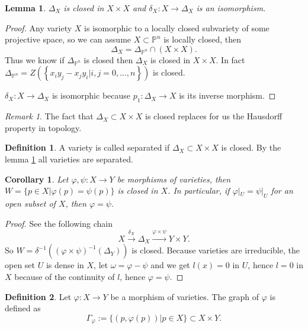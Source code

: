 \documentclass{amsart}
\theoremstyle{plain}
\newtheorem{corollary}{Corollary}
\newtheorem{lemma}{Lemma}
\theoremstyle{definition}
\newtheorem{definition}{Definition}
\theoremstyle{remark}
\newtheorem*{remark}{Remark}
\numberwithin{equation}{section}
\begin{document}
 \begin{lemma}\label{20}
 	$ \Delta_X $ is closed in $ X\times X $ and $ \delta_X:X\to \Delta_X $ is an isomorphism.
 \end{lemma}
 \begin{proof}
 	Any variety $ X $ is isomorphic to a locally closed subvariety of some projective space, so we can assume $ X\subset\mathbb{P}^n $ is locally closed, then
 	$$
 	\Delta_X=\Delta_{\mathbb{P}^n}\cap (X\times X).
 	$$
 	Thus we know if $ \Delta_{\mathbb{P}^n} $ is closed then $ \Delta_X $ is closed in $ X\times X $.
 	In fact $ \Delta_{\mathbb{P}^n}=Z\left( \left\lbrace x_iy_j-x_jy_i|i,j=0,\dots,n \right\rbrace \right) $ is closed.
 	
 	$ \delta_X:X\to \Delta_X $ is isomorphic because $ p_1:\Delta_X\to X $ is its inverse morphism.
 \end{proof}
 \begin{remark}
 	The fact that $ \Delta_X\subset X\times X $ is closed replaces for us the Hausdorff property in topology.
 \end{remark}
 \begin{definition}
 	A variety is called separated if $ \Delta_X\subset X\times X $ is closed. By the lemma \ref{20} all varieties are separated.
 \end{definition}
 \begin{corollary}
 	Let $ \varphi,\psi:X\to Y $ be morphisms of varieties, then $ W=\{ p\in X|\varphi(p)=\psi(p) \} $ is closed in $ X $. In particular, if $ \varphi|_U=\psi|_U $ for an open subset of $ X $, then $ \varphi=\psi $.
 \end{corollary}
 \begin{proof}
 	See the following chain
 	$$
 	X\xrightarrow{\delta_X} \Delta_X\xrightarrow{\varphi\times\psi} Y\times Y.
 	$$
 	So $ W=\delta^{-1}( (\varphi\times\psi)^{-1}(\Delta_Y) ) $ is closed. Because varieties are irreducible, the open set $ U $ is dense in $ X $, let $ \omega = \varphi-\psi $ and we get $ l(x)=0 $ in $ U $, hence $ l=0 $ in $ X $ because of the continuity of $ l $, hence $ \varphi=\psi $.
 \end{proof}
 \begin{definition}
 	Let $ \varphi :X\to Y $ be a morphism of varieties. The graph of $ \varphi $ is defined as
 	\begin{equation}
 	\Gamma_{\varphi}:=\{ \left(p,\varphi\left(p\right)\right)| p\in X \}\subset X\times Y.
 	\end{equation}
 \end{definition}
\end{document}
